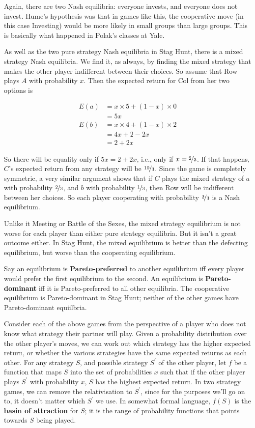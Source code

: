 \documentclass[
  11pt,
  letterpaper,
]{scrbook}
\begin{document}
Again, there are two Nash equilibria: everyone invests, and everyone
does not invest. Hume's hypothesis was that in games like this, the
cooperative move (in this case Investing) would be more likely in small
groups than large groups. This is basically what happened in Polak's
classes at Yale.

As well as the two pure strategy Nash equilibria in Stag Hunt, there is
a mixed strategy Nash equilibria. We find it, as always, by finding the
mixed strategy that makes the other player indifferent between their
choices. So assume that Row plays \(A\) with probability \(x\). Then the
expected return for Col from her two options is

\begin{align*}
E(a) &= x \times 5 + (1-x) \times 0 \\
 &= 5x \\
E(b) &= x \times 4 + (1-x) \times 2 \\
 &= 4x + 2 - 2x \\
 &= 2 + 2x
\end{align*}

So there will be equality only if \(5x = 2 + 2x\), i.e., only if
\(x = \nicefrac{2}{3}\). If that happens, \(C\)'s expected return from
any strategy will be \(\nicefrac{10}{3}\). Since the game is completely
symmetric, a very similar argument shows that if \(C\) plays the mixed
strategy of \(a\) with probability \(\nicefrac{2}{3}\), and \(b\) with
probability \(\nicefrac{1}{3}\), then Row will be indifferent between
her choices. So each player cooperating with probability
\(\nicefrac{2}{3}\) is a Nash equilibrium.

Unlike it Meeting or Battle of the Sexes, the mixed strategy equilibrium
is not worse for each player than either pure strategy equilibria. But
it isn't a great outcome either. In Stag Hunt, the mixed equilibrium is
better than the defecting equilibrium, but worse than the cooperating
equilibrium.

Say an equilibrium is \textbf{Pareto-preferred} to another equilibrium
iff every player would prefer the first equilibrium to the second. An
equilibrium is \textbf{Pareto-dominant} iff it is Pareto-preferred to
all other equilibria. The cooperative equilibrium is Pareto-dominant in
Stag Hunt; neither of the other games have Pareto-dominant equiilbria.

Consider each of the above games from the perspective of a player who
does not know what strategy their partner will play. Given a probability
distribution over the other player's moves, we can work out which
strategy has the higher expected return, or whether the various
strategies have the same expected returns as each other. For any
strategy \(S\), and possible strategy \(S^\prime\) of the other player,
let \(f\) be a function that maps \(S\) into the set of probabilities
\(x\) such that if the other player plays \(S^\prime\) with probability
\(x\), \(S\) has the highest expected return. In two strategy games, we
can remove the relativisation to \(S^\prime\), since for the purposes
we'll go on to, it doesn't matter which \(S^\prime\) we use. In somewhat
formal language, \(f(S)\) is the \textbf{basin of attraction} for \(S\);
it is the range of probability functions that points towards \(S\) being
played.
\end{document}
